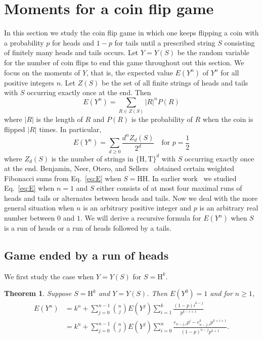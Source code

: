 \documentclass[10pt]{amsart}
\newtheorem{theorem}{Theorem}[section]
\theoremstyle{definition}
\theoremstyle{remark}
\newcommand{\HH}{\mathrm{H}} \newcommand{\TT}{\mathrm{T}}
\begin{document}



\section{Moments for a coin flip game}\label{sec:coin}

In this section we study the coin flip game in which one keeps flipping a coin with a probability $p$ for heads and $1-p$ for tails until a prescribed string $S$ consisting of finitely many heads and tails occurs.
Let $Y=Y(S)$ be the random variable for the number of coin flips to end this game throughout out this section.
We focus on the moments of $Y$, that is, the expected value $E(Y^n)$ of $Y^n$ for all positive integers $n$.
Let $Z(S)$ be the set of all finite strings of heads and tails with $S$ occurring exactly once at the end.
Then 
\[ E(Y^n) = \sum_{R\in Z(S)} |R|^n P(R) \]
where $|R|$ is the length of $R$ and $P(R)$ is the probability of $R$ when the coin is flipped $|R|$ times.
In particular, 
\begin{equation}\label{eq:E}
E(Y^n) = \sum_{d\ge0} \frac{d^n Z_d(S)}{2^d} \quad \text{for } p=\frac12
\end{equation}
where $Z_d(S)$ is the number of strings in $\{\HH,\TT\}^d$ with $S$ occurring exactly once at the end.
Benjamin, Neer, Otero, and Sellers~\cite{ProbFibSum} obtained certain weighted Fibonacci sums from Eq.~\eqref{eq:E} when $S=\HH\HH$.
In earlier work~\cite{Huang} we studied Eq.~\eqref{eq:E} when $n=1$ and $S$ either consists of at most four maximal runs of heads and tails or alternates between heads and tails.
Now we deal with the more general situation when $n$ is an arbitrary positive integer and $p$ is an arbitrary real number between $0$ and $1$.
We will derive a recursive formula for $E(Y^n)$ when $S$ is a run of heads or a run of heads followed by a tails.

\subsection{Game ended by a run of heads}
We first study the case when $Y=Y(S)$ for $S=\HH^k$.

\begin{theorem}\label{thm:Hk}
Suppose $S=\HH^k$ and $Y=Y(S)$. 
Then $E(Y^0)=1$ and for $n\ge1$, 
\begin{align*}
E(Y^n) &= k^n + \sum_{j=0}^{n-1} \binom{n}{j} E(Y^j) \sum_{i=1}^k \frac{(1-p)i^{n-j}}{p^{k-i+1}} \\
&= k^n + \sum_{j=0}^{n-1} \binom{n}{j} E(Y^j) \sum_{i=0}^n \frac{e_{n-j,i} p^i - e_{n-j,i}^k p^{k+i+1}}{(1-p)^{n-j}p^{k+1}}.
\end{align*}
\end{theorem}
\end{document}
